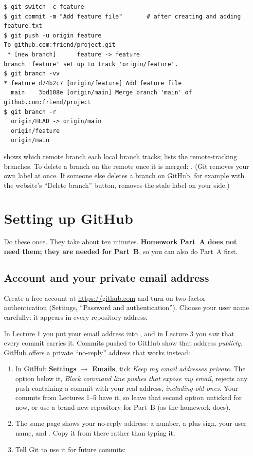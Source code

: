 \begin{lstlisting}
$ git switch -c feature
$ git commit -m "Add feature file"       # after creating and adding feature.txt
$ git push -u origin feature
To github.com:friend/project.git
 * [new branch]      feature -> feature
branch 'feature' set up to track 'origin/feature'.
$ git branch -vv
* feature d74b2c7 [origin/feature] Add feature file
  main    3bd108e [origin/main] Merge branch 'main' of github.com:friend/project
$ git branch -r
  origin/HEAD -> origin/main
  origin/feature
  origin/main
\end{lstlisting}

 shows which remote branch each local branch tracks;  lists the remote-tracking branches. To delete a branch on the remote once it is merged: . (Git removes your own  label at once. If someone else deletes a branch on GitHub, for example with the website's ``Delete branch'' button,  removes the stale label on your side.)

\section{Setting up GitHub}\label{sec:github-setup}

Do these once. They take about ten minutes. \textbf{Homework Part~A does not need them; they are needed for Part~B}, so you can also do Part~A first.

\subsection{Account and your private email address}

Create a free account at \url{https://github.com} and turn on two-factor authentication (Settings, ``Password and authentication''). Choose your user name carefully: it appears in every repository address.

In Lecture 1 you put your email address into , and in Lecture 3 you saw that every commit carries it. Commits pushed to GitHub show that address \emph{publicly}. GitHub offers a private ``no-reply'' address that works instead:

\begin{enumerate}
  \item In GitHub \textbf{Settings $\rightarrow$ Emails}, tick \emph{Keep my email addresses private}. The option below it, \emph{Block command line pushes that expose my email}, rejects any push containing a commit with your real address, \emph{including old ones}. Your commits from Lectures 1--5 have it, so leave that second option unticked for now, or use a brand-new repository for Part~B (as the homework does).
  \item The same page shows your no-reply address: a number, a plus sign, your user name, and . Copy it from there rather than typing it.
  \item Tell Git to use it for future commits:
\end{enumerate}

